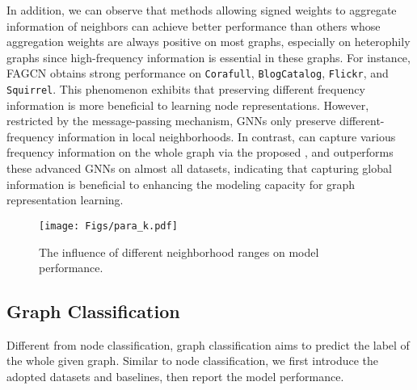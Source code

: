 \documentclass[sigconf, screen]{acmart}
\begin{document}
In addition, we can observe that methods allowing signed weights to aggregate information of neighbors can achieve better performance than others whose aggregation weights are always positive on most graphs, especially on heterophily graphs since high-frequency information is essential in these graphs.
For instance, FAGCN obtains strong performance on \texttt{Corafull}, \texttt{BlogCatalog}, \texttt{Flickr}, and \texttt{Squirrel}.
This phenomenon exhibits that preserving different frequency information is more beneficial to learning node representations.
However, restricted by the message-passing mechanism, GNNs only preserve different-frequency information in local neighborhoods.
In contrast, \name can capture various frequency information on the whole graph via the proposed \saname, and outperforms these advanced GNNs on almost all datasets, indicating that capturing global information is beneficial to enhancing the modeling capacity for graph representation learning.

\begin{table*}[t]
\caption{Performances of \name and its variants on the node classification task.}
\label{tab:attre}
\centering
\renewcommand\arraystretch{1.0}
\end{table*} \begin{figure*}[t]
\centering
\texttt{[image: Figs/para\_k.pdf]}
\caption{
The influence of different neighborhood ranges on model performance.
}
\label{fig:k}
\end{figure*}

\subsection{Graph Classification}
Different from node classification, graph classification aims to predict the label of the whole given graph. 
Similar to node classification, we first introduce the adopted datasets and baselines, then report the model performance.
\end{document}

